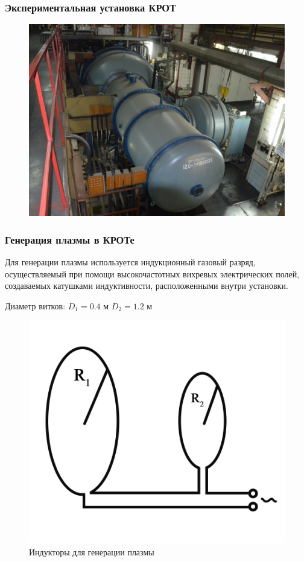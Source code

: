 \documentclass[10pt,pdf,hyperref={unicode}, dvipsnames]{beamer}
\begin{document}
\begin{frame}[t]\frametitle{Экспериментальная установка КРОТ}

\begin{figure}[H]
	\centering
	\vspace{-5pt}
	\includegraphics[width=\linewidth]{fig/krotphoto}
	\caption{}
	\label{fig:krot_photo}
\end{figure}



\end{frame}
\begin{frame}
	\frametitle{Генерация плазмы в КРОТе}

		Для генерации плазмы используется индукционный газовый разряд, осуществляемый при помощи высокочастотных вихревых электрических
	полей, создаваемых катушками индуктивности, расположенными внутри установки.

	Диаметр витков: $D_1=0.4$ м $D_2=1.2$ м

	\begin{figure}[H]
		\begin{minipage}{\linewidth}
				\centering
				\includegraphics[width=0.6\linewidth]{fig/induct}
				\vspace{-25pt}
				\caption*{Индукторы для генерации плазмы}

				\label{fig:resonator}
		\end{minipage}
		\end{figure}
\end{frame}
\end{document}
